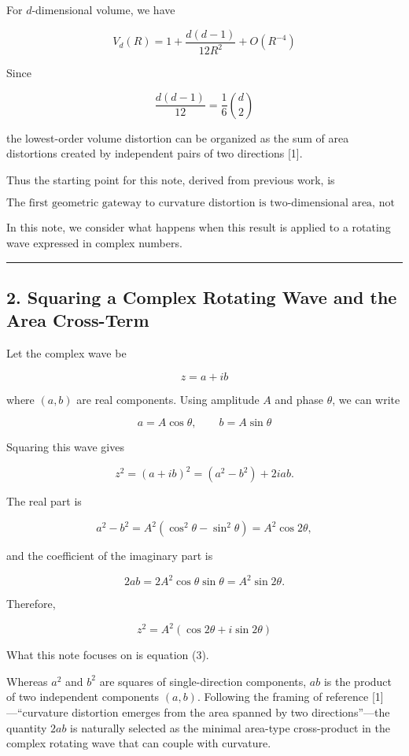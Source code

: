 \documentclass[
  a4paper,
]{article}
\begin{document}
For \(d\)-dimensional volume, we have

\[V_d(R) = 1+\frac{d(d-1)}{12R^2}+O(R^{-4})\]

Since

\[\frac{d(d-1)}{12} = \frac{1}{6}\binom{d}{2}\]

the lowest-order volume distortion can be organized as the sum of area
distortions created by independent pairs of two directions {[}1{]}.

Thus the starting point for this note, derived from previous work, is

\[\boxed{\text{The first geometric gateway to curvature distortion is two-dimensional area, not one-dimensional length}}\]

In this note, we consider what happens when this result is applied to a
rotating wave expressed in complex numbers.

\begin{center}\rule{0.5\linewidth}{0.5pt}\end{center}

\subsection{2. Squaring a Complex Rotating Wave and the Area
Cross-Term}\label{squaring-a-complex-rotating-wave-and-the-area-cross-term}

Let the complex wave be

\[z=a+ib\]

where \((a,b)\) are real components. Using amplitude \(A\) and phase
\(\theta\), we can write

\[a=A\cos\theta,\qquad b=A\sin\theta\]

Squaring this wave gives

\[z^2 = (a+ib)^2 = (a^2-b^2)+2iab. \tag{1}\]

The real part is

\[a^2-b^2 = A^2(\cos^2\theta-\sin^2\theta) = A^2\cos2\theta, \tag{2}\]

and the coefficient of the imaginary part is

\[2ab = 2A^2\cos\theta\sin\theta = A^2\sin2\theta. \tag{3}\]

Therefore,

\[\boxed{z^2=A^2(\cos2\theta+i\sin2\theta)} \tag{4}\]

What this note focuses on is equation (3).

Whereas \(a^2\) and \(b^2\) are squares of single-direction components,
\(ab\) is the product of two independent components \((a,b)\). Following
the framing of reference {[}1{]}---``curvature distortion emerges from
the area spanned by two directions''---the quantity \(2ab\) is naturally
selected as the minimal area-type cross-product in the complex rotating
wave that can couple with curvature.
\end{document}
